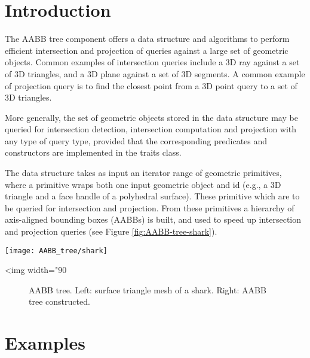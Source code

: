 \section{Introduction}
\label{AABB_tree_section_intro}

The AABB tree component offers a data structure and algorithms to perform efficient intersection and projection of queries against a large set of geometric objects. Common examples of intersection queries include a 3D ray against a set of 3D triangles, and a 3D plane against a set of 3D segments. A common example of projection query is to find the closest point from a 3D point query to a set of 3D triangles.

More generally, the set of geometric objects stored in the data structure may be queried for intersection detection, intersection computation and projection with any type of query type, provided that the corresponding predicates and constructors are implemented in the traits class. 

The data structure takes as input an iterator range of geometric primitives, where a primitive wraps both one input geometric object and id (e.g., a 3D triangle and a face handle of a polyhedral surface). These primitive which are to be queried for intersection and projection. From these primitives a hierarchy of axis-aligned bounding boxes (AABBs) is built, and used to speed up intersection and projection queries (see Figure \ref{fig:AABB-tree-shark}). 

\begin{center}
    \label{fig:AABB-tree-shark}
    \begin{ccTexOnly}
      \texttt{[image: AABB\_tree/shark]}
    \end{ccTexOnly}
    \begin{ccHtmlOnly}
        <img width="90%
    \end{ccHtmlOnly}
    \begin{figure}[h]
        \caption{AABB tree.
                 Left: surface triangle mesh of a shark.
                 Right: AABB tree constructed.}
    \end{figure}
\end{center}

\section{Examples}
\label{AABB_tree_section_examples}

